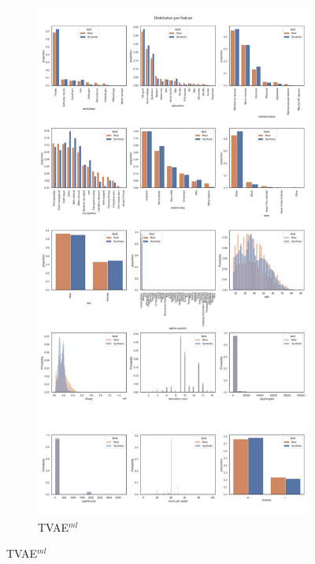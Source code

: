 \newpage
\begin{landscape}
	\begin{figure}[h]
		\centering
		\hfill
		\begin{subfigure}{0.3\linewidth}
			\includegraphics[height=\textheight,width=\linewidth,keepaspectratio]{images/distributions_full/tvae.jpg}
			\caption{TVAE$^{ml}$}
		\end{subfigure}		

\end{figure}
\end{landscape}
